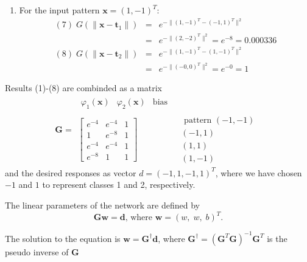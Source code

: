 \begin{enumerate}
\begin{solution}
\begin{enumerate}
    \item For the input pattern $\mathbf{x}=(1,-1)^T$:
      \begin{eqnarray*}
        (7)\;G(\|\mathbf{x}-\mathbf{t}_1\|)&=&e^{-\|(1,-1)^T-(-1,1)^T\|^2}\\
        &=&e^{-\|(2,-2)^T\|^2}=e^{-8}=0.000336\\
        (8)\;G(\|\mathbf{x}-\mathbf{t}_2\|)&=&e^{-\|(1,-1)^T-(1,-1)^T\|^2}\\
        &=&e^{-\|(-0,0)^T\|^2}=e^{-0}=1
      \end{eqnarray*}
    \end{enumerate}

    Results (1)-(8) are combinded as a matrix
    \begin{equation*}
      \mathbf{G}=\begin{array}{cl}
        \begin{array}{ccc}
          \varphi_1(\mathbf{x})&\varphi_2(\mathbf{x})&\mbox{bias}
        \end{array} &\\
        \left[
          \begin{array}{ccc}
            e^{-4} & e^{-4} & 1\\
            1 & e^{-8}& 1\\
            e^{-4} & e^{-4} & 1\\
            e^{-8}& 1 & 1
          \end{array}
        \right] &
        \begin{array}{r}
          \mbox{ pattern }(-1,-1)\\
          (-1,1)\\
          (1,1)\\
          (1,-1)
        \end{array}
      \end{array}
    \end{equation*}
    and the desired responses as vector $d=(-1,1,-1,1)^T$, where we
    have chosen $-1$ and $1$ to represent classes 1 and 2,
    respectively.

    The linear parameters of the network are defined by
    \begin{equation*}
      \mathbf{Gw}=\mathbf{d}\mbox{, where }\mathbf{w}=(w,\;w,\;b)^T.
    \end{equation*}

    The solution to the equation is
    $\mathbf{w}=\mathbf{G}^\dagger\mathbf{d}$, where
    $\mathbf{G}^\dagger=(\mathbf{G}^T\mathbf{G})^{-1}\mathbf{G}^T$ is
    the pseudo inverse of $\mathbf{G}$


\end{solution}
\end{enumerate}
